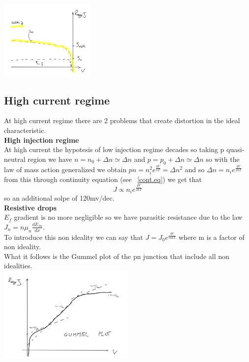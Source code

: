 \centering
\includegraphics[width=0.35\textwidth]{inverselow.png}\\
\raggedright

\subsection{High current regime}
At high current regime there are 2 problems that create distortion in the ideal characteristic.\\
{\bf High injection regime}\\
At high current the hypotesis of low injection regime decades so taking p quasi-neutral region we have $n=n_0+\Delta n\simeq\Delta n$ and $p=p_0+\Delta n\simeq \Delta n$ so with the law of mass action generalized we obtain $pn=n_i^2e^{\frac{qV}{kT}}=\Delta n^2$ and so $\Delta n=n_ie^{\frac{qV}{2kT}}$ from this through continuity equation (see ~\ref{cont.eq}) we get that 
\begin{equation}
J\propto n_ie^{\frac{qV}{2kT}}
\end{equation}
so an additional solpe of 120mv/dec.\\ 
{\bf Resistive drops}\\
$E_f$ gradient is no more negligible so we have parasitic resistance due to the law $J_n=n\mu_n \frac{dE_{fn}}{dx}$.\\
To introduce this non ideality we can say that $J=J_0e^{\frac{qv}{mkT}}$ where m is a factor of non ideality.\\
What it follows is the Gummel plot of the pn junction that include all non idealities.\\

\centering
\includegraphics[width=0.5\textwidth]{gummel.png}\\
\raggedright

